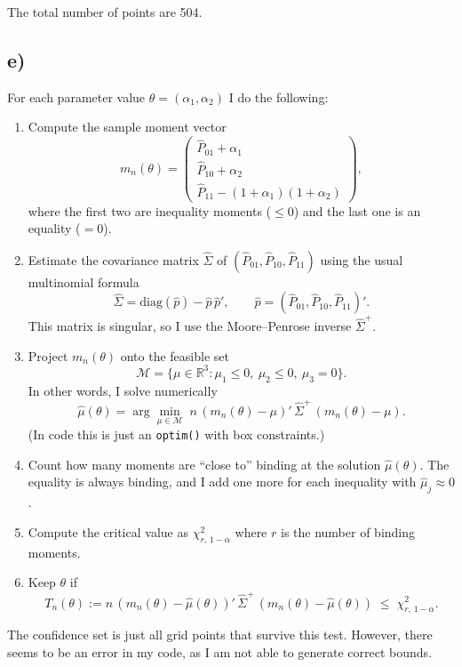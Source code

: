 \documentclass{article}
\begin{document}
The total number of points are 504.


\subsection*{e)}

For each parameter value $\theta=(\alpha_1,\alpha_2)$ I do the following:

\begin{enumerate}
    \item Compute the sample moment vector
    \[
    m_n(\theta)=
    \begin{pmatrix}
    \hat P_{01} + \alpha_1\\
    \hat P_{10} + \alpha_2\\
    \hat P_{11} - (1+\alpha_1)(1+\alpha_2)
    \end{pmatrix},
    \]
    where the first two are inequality moments ($\le 0$) and the last one is an equality ($=0$).

    \item Estimate the covariance matrix $\hat\Sigma$ of $(\hat P_{01},\hat P_{10},\hat P_{11})$ using the usual multinomial formula
    \[
    \hat\Sigma = \mathrm{diag}(\hat p) - \hat p\,\hat p', \qquad \hat p=(\hat P_{01},\hat P_{10},\hat P_{11})'.
    \]
    This matrix is singular, so I use the Moore--Penrose inverse $\hat\Sigma^+$.

    \item Project $m_n(\theta)$ onto the feasible set
    \[
    \mathcal{M} = \{\mu\in\mathbb{R}^3 : \mu_1\le 0,\ \mu_2\le 0,\ \mu_3=0\}.
    \]
    In other words, I solve numerically
    \[
    \hat\mu(\theta) = \arg\min_{\mu\in\mathcal{M}} \;
    n\,(m_n(\theta)-\mu)'\,\hat\Sigma^+\,(m_n(\theta)-\mu).
    \]
    (In code this is just an \texttt{optim()} with box constraints.)

    \item Count how many moments are ``close to'' binding at the solution $\hat\mu(\theta)$. The equality is always binding, and I add one more for each inequality with $\hat\mu_j\approx 0$.

    \item Compute the critical value as $\chi^2_{r,\,1-\alpha}$ where $r$ is the number of binding moments.

    \item Keep $\theta$ if
    \[
    T_n(\theta)
    :=
    n\,(m_n(\theta)-\hat\mu(\theta))'\,\hat\Sigma^+\,(m_n(\theta)-\hat\mu(\theta))
    \;\le\;
    \chi^2_{r,\,1-\alpha}.
    \]
\end{enumerate}

The confidence set is just all grid points that survive this test. However, there seems to be an error in my code, as I am not able to generate correct bounds.
\end{document}

